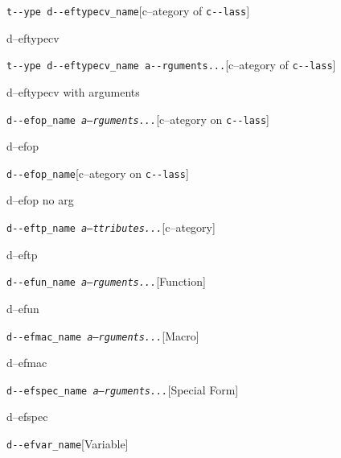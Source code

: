 \documentclass{book}
\begin{document}
\noindent\texttt{t{-}{-}ype d{-}{-}eftypecv\_name}\hfill[c--ategory of \texttt{c{-}{-}lass}]



%
d--eftypecv

\noindent\texttt{t{-}{-}ype d{-}{-}eftypecv\_name a{-}{-}rguments...}\hfill[c--ategory of \texttt{c{-}{-}lass}]



%
d--eftypecv with arguments

\noindent\texttt{d{-}{-}efop\_name \EmbracOn{}\textnormal{\textsl{a--rguments...}}\EmbracOff{}}\hfill[c--ategory on \texttt{c{-}{-}lass}]



%
d--efop

\noindent\texttt{d{-}{-}efop\_name}\hfill[c--ategory on \texttt{c{-}{-}lass}]



%
d--efop no arg

\noindent\texttt{d{-}{-}eftp\_name \EmbracOn{}\textnormal{\textsl{a--ttributes...}}\EmbracOff{}}\hfill[c--ategory]



%
d--eftp

\noindent\texttt{d{-}{-}efun\_name \EmbracOn{}\textnormal{\textsl{a--rguments...}}\EmbracOff{}}\hfill[Function]



%
d--efun

\noindent\texttt{d{-}{-}efmac\_name \EmbracOn{}\textnormal{\textsl{a--rguments...}}\EmbracOff{}}\hfill[Macro]



%
d--efmac

\noindent\texttt{d{-}{-}efspec\_name \EmbracOn{}\textnormal{\textsl{a--rguments...}}\EmbracOff{}}\hfill[Special Form]



%
d--efspec

\noindent\texttt{d{-}{-}efvar\_name}\hfill[Variable]
\end{document}
